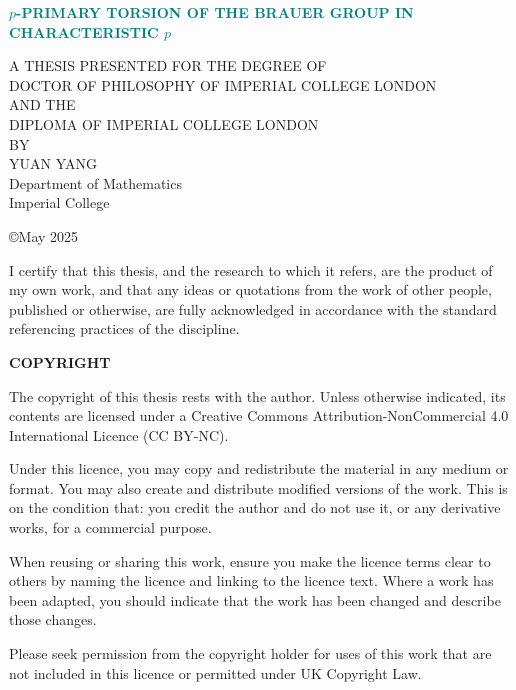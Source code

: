 \documentclass[a4paper,12pt,twoside]{report}
\begin{document}
\begin{center}
\vspace*{6em}
\begin{doublespace}
{\textbf{{\Large \textcolor{teal}{$p$-PRIMARY TORSION OF THE BRAUER GROUP IN CHARACTERISTIC $p$}}}}%
\end{doublespace}
\vspace*{7em}
{\small
{A THESIS PRESENTED FOR THE DEGREE OF}\\
{DOCTOR OF PHILOSOPHY OF IMPERIAL COLLEGE LONDON}\\
{AND THE}\\
{DIPLOMA OF IMPERIAL COLLEGE LONDON}\\
{BY}}\\
\vspace*{1em}
{\Large{YUAN YANG}}\\
\vspace*{5em}
{Department of Mathematics}\\
{Imperial College}\\

\vspace*{12em}
\begin{onehalfspace}
{\copyright  May 2025}\\ 

\end{onehalfspace}

\end{center}
\newpage

\vspace*{20em}
\large{I certify that this thesis, and the research to which it refers, are the product of my own work, 
and that any ideas or quotations from the work of other people, published or otherwise, 
are fully acknowledged in accordance with the standard referencing practices of the discipline. }

\newpage

\vspace*{4em}
\begin{flushright}
{\Huge\textbf{COPYRIGHT}}
\end{flushright}
\vspace*{3em}
\large{
The copyright of this thesis rests with the author. Unless otherwise indicated, its contents are licensed under a Creative Commons Attribution-NonCommercial 4.0 International Licence (CC BY-NC).

\noindent Under this licence, you may copy and redistribute the material in any medium or format. You may also create and distribute modified versions of the work. This is on the condition that: you credit the author and do not use it, or any derivative works, for a commercial purpose.

\noindent When reusing or sharing this work, ensure you make the licence terms clear to others by naming the licence and linking to the licence text. Where a work has been adapted, you should indicate that the work has been changed and describe those changes.

\noindent Please seek permission from the copyright holder for uses of this work that are not included in this licence or permitted under UK Copyright Law.}
\end{document}

